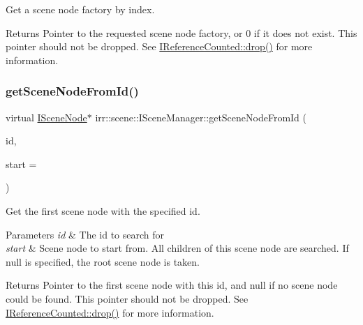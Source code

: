 Get a scene node factory by index. 

\begin{DoxyReturn}{Returns}
Pointer to the requested scene node factory, or 0 if it does not exist. This pointer should not be dropped. See \hyperlink{classirr_1_1IReferenceCounted_a03856a09355b89d178090c4a5f738543}{I\+Reference\+Counted\+::drop()} for more information. 
\end{DoxyReturn}
\mbox{\label{classirr_1_1scene_1_1ISceneManager_a038e2afb1397fe8f2b6f8f6c55d52b55}} 
\subsubsection{\texorpdfstring{get\+Scene\+Node\+From\+Id()}{getSceneNodeFromId()}\hspace{0.1cm}{\footnotesize\ttfamily [1/2]}}
{\footnotesize\ttfamily virtual \hyperlink{classirr_1_1scene_1_1ISceneNode}{I\+Scene\+Node}$\ast$ irr\+::scene\+::\+I\+Scene\+Manager\+::get\+Scene\+Node\+From\+Id (\begin{DoxyParamCaption}\item[{\hyperlink{namespaceirr_ac66849b7a6ed16e30ebede579f9b47c6}{s32}}]{id,  }\item[{\hyperlink{classirr_1_1scene_1_1ISceneNode}{I\+Scene\+Node} $\ast$}]{start = {} }\end{DoxyParamCaption})\hspace{0.3cm}{\ttfamily [pure virtual]}}



Get the first scene node with the specified id. 


\begin{DoxyParams}{Parameters}
{\em id} & The id to search for \\
\hline
{\em start} & Scene node to start from. All children of this scene node are searched. If null is specified, the root scene node is taken. \\
\hline
\end{DoxyParams}
\begin{DoxyReturn}{Returns}
Pointer to the first scene node with this id, and null if no scene node could be found. This pointer should not be dropped. See \hyperlink{classirr_1_1IReferenceCounted_a03856a09355b89d178090c4a5f738543}{I\+Reference\+Counted\+::drop()} for more information. 
\end{DoxyReturn}
\mbox{\label{classirr_1_1scene_1_1ISceneManager_a038e2afb1397fe8f2b6f8f6c55d52b55}} 
